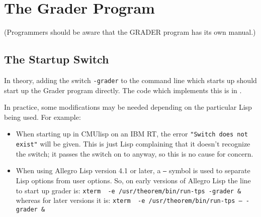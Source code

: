 \chapter{The Grader Program}

(Programmers should be aware that the GRADER program has its own manual.)

\section{The Startup Switch}

In theory, adding the switch {\tt -grader} to the command line which 
starts up \TPS should start up the Grader program directly. The code which 
implements this is in .

In practice, some modifications may be needed depending on the particular 
Lisp being used. For example:

\begin{itemize}
\item When starting up in CMUlisp on an IBM RT, the error {\tt "Switch does not exist"}
will be given. This is just Lisp complaining that it doesn't recognize the switch;
it passes the switch on to \TPS anyway, so this is no cause for concern.

\item When using Allegro Lisp version 4.1 or later, a {\tt --} symbol is used to separate
Lisp options from user options. So, on early versions of Allegro Lisp the line to
start up grader is:
{\tt xterm {\it <many xterm switches>} -e /usr/theorem/bin/run-tps -grader \&}
whereas for later versions it is:
{\tt xterm {\it <many xterm switches>} -e /usr/theorem/bin/run-tps -- -grader \&}
\end{itemize}
